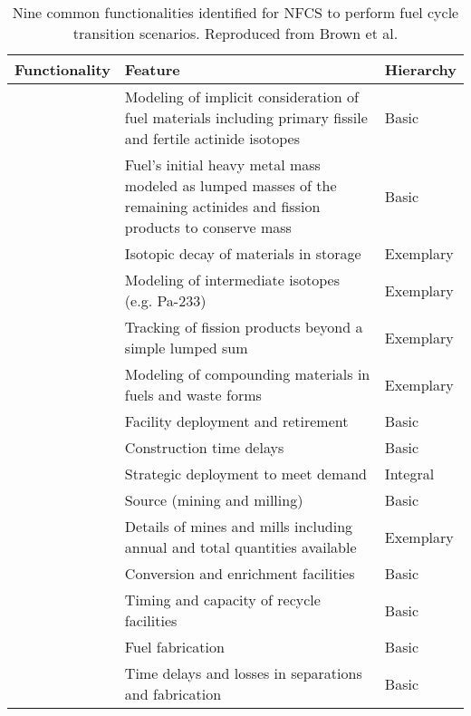 \begin{table}[h]
    \centering
    \caption {Nine common functionalities identified for \gls{NFCS} to perform
    			fuel cycle transition scenarios. Reproduced from Brown et al. \cite{brown_identification_2016}}
    \label{tab:ffh}
    \begin{tabularx}{\textwidth}{lXl}
        \hline
        \textbf{Functionality}&\textbf{Feature} &\textbf{Hierarchy} \\
        \hline
         & Modeling of implicit consideration of fuel materials including primary fissile and fertile actinide isotopes & Basic \\
        	& Fuel's initial heavy metal mass modeled as lumped masses  of the remaining actinides and fission products to conserve mass & Basic \\
        	& Isotopic decay of materials in storage & Exemplary \\
        	& Modeling of intermediate isotopes (e.g. Pa-233) & Exemplary \\
        	& Tracking of fission products beyond a simple lumped sum & Exemplary \\
        	& Modeling of compounding materials in fuels and waste forms & Exemplary\\

        \hline

         & Facility deployment and retirement & Basic \\
        	& Construction time delays & Basic \\
        	& Strategic deployment to meet demand &Integral \\

        \hline

         & Source (mining and milling) & Basic \\
        	& Details of mines and mills including annual and total quantities available & Exemplary \\
        	& Conversion and enrichment facilities & Basic \\
        	& Timing and capacity of recycle facilities & Basic \\
        	& Fuel fabrication & Basic \\
        	& Time delays and losses in separations and fabrication & Basic \\


\end{tabularx}
\end{table}
